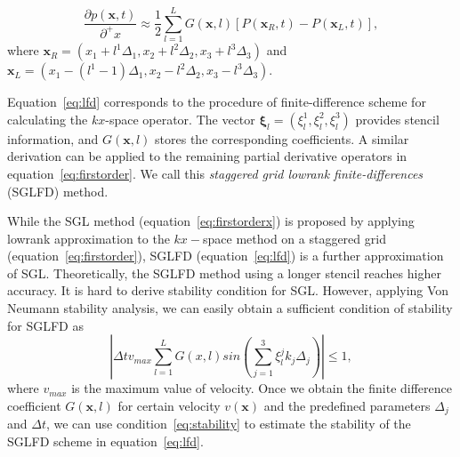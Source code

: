 \begin{equation}
\label{eq:lfd}
\displaystyle \frac{\partial p(\mathbf{x},t)}{\partial^+x} \approx \displaystyle \frac{1}{2}\sum\limits_{l=1}^LG(\mathbf{x},l)[P(\mathbf{x}_R,t)-P(\mathbf{x}_L,t)], 
\end{equation}
where $\mathbf{x}_R=(x_1+l^1\Delta_1,x_2+l^2\Delta_2,x_3+l^3\Delta_3)$ and $\mathbf{x}_L=(x_1-(l^1-1)\Delta_1,x_2-l^2\Delta_2,x_3-l^3\Delta_3)$. 

Equation~\ref{eq:lfd} corresponds to the procedure of finite-difference scheme for calculating the $kx$-space operator. The vector $\mathbf{\xi}_l = (\xi_l^1, \xi_l^2,\xi_l^3)$ provides stencil information, and $G(\mathbf{x},l)$ stores the corresponding coefficients. A similar derivation can be applied to the remaining partial derivative operators in equation~\ref{eq:firstorder}. We call this \emph{staggered grid lowrank finite-differences} (SGLFD) method.

While the SGL method (equation~\ref{eq:firstorderx}) is proposed by applying lowrank approximation to the $kx-$space method on a staggered grid (equation~\ref{eq:firstorder}), SGLFD (equation~\ref{eq:lfd}) is a further approximation of SGL. Theoretically, the SGLFD method using a longer stencil reaches higher accuracy. It is hard to derive stability condition for SGL. However, applying Von Neumann stability analysis, we can easily obtain a sufficient condition of stability for SGLFD as
\begin{equation}
\label{eq:stability}
\left|\Delta tv_{max}\sum\limits_{l=1}^{L}G(x,l)sin(\sum\limits_{j=1}^3\xi_l^jk_j\Delta_j) \right| \leq 1,
\end{equation}
where $v_{max}$ is the maximum value of velocity. Once we obtain the finite difference coefficient $G(\mathbf{x},l)$ for certain velocity $v(\mathbf{x})$ and the predefined parameters $\Delta_j$ and $\Delta t$, we can use condition~\ref{eq:stability} to estimate the stability of the SGLFD scheme in equation~\ref{eq:lfd}.


